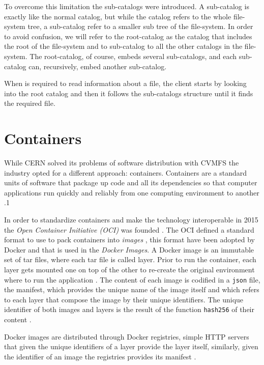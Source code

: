 To overcome this limitation the sub-catalogs were introduced.  A sub-catalog is
exactly like the normal catalog, but while the catalog refers to the whole
file-system tree, a sub-catalog refer to a smaller sub tree of the file-system.
In order to avoid confusion, we will refer to the root-catalog as the catalog
that includes the root of the file-system and to sub-catalog to all the other
catalogs in the file-system. The root-catalog, of course, embeds several
sub-catalogs, and each sub-catalog can, recursively, embed another sub-catalog.

When is required to read information about a file, the client starts by looking
into the root catalog and then it follows the sub-catalogs structure until it
finds the required file.

\section{Containers}
\label{sec:containers}

While CERN solved its problems of software distribution with CVMFS the industry
opted for a different approach: containers. 
Containers are a standard units of software that package up code and all its
dependencies so that computer applications run quickly and reliably from one
computing environment to another \cite{docker:what}.1

In order to standardize containers and make the technology interoperable in
2015 the \textit{Open Container Initiative (OCI)} was founded \cite{oci}. The
OCI defined a standard format to use to pack containers into \textit{images}
\cite{oci-image-spec}, this format have been adopted by Docker and that is used
in the \textit{Docker Images}.
A Docker image is an immutable
set of tar files, where each tar file is called layer. Prior to run the container,
each layer gets mounted one on top of the other to re-create the original
environment where to run the application \cite{oci:image-filesystem}. The
content of each image is codified in a \texttt{json} file, the manifest, which
provides the unique name of the image itself and which refers to each layer that
compose the image by their unique identifiers. The unique identifier of both
images and layers is the result of the function \texttt{hash256} of their
content \cite{oci:content}. 

Docker images are distributed through Docker registries, simple HTTP servers
that given the unique identifiers of a layer provide the layer itself,
similarly, given the identifier of an image the registries provides its
manifest \cite{docker:registry}.

